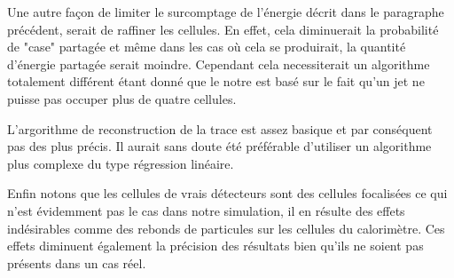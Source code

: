 \documentclass[11pt]{article}
\begin{document}
Une autre façon de limiter le surcomptage de l'énergie décrit dans le paragraphe précédent, serait de raffiner les 
cellules. En effet, cela diminuerait la probabilité de "case" partagée et même dans les cas où cela se produirait, la
quantité d'énergie partagée serait moindre. Cependant cela necessiterait un algorithme totalement différent
étant donné que le notre est basé sur le fait qu'un jet ne puisse pas occuper plus de quatre cellules.

L'argorithme de reconstruction de la trace est assez basique et par conséquent pas des plus précis. Il aurait sans doute
été préférable d'utiliser un algorithme plus complexe du type régression linéaire.

Enfin notons que les cellules de vrais d\'etecteurs sont des cellules focalisées ce qui n'est évidemment pas le 
cas dans notre simulation, il en résulte des effets indésirables comme des rebonds de particules sur les cellules du
calorimètre. Ces effets diminuent également la précision des résultats bien qu'ils ne soient pas présents dans un cas réel.


		
\end{document}
